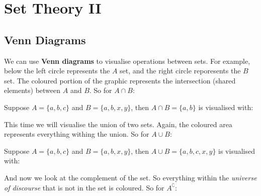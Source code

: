 \chapter{Set Theory II}

\section{Venn Diagrams}

We can use {\bf Venn diagrams} to visualise operations between sets. For example, below the left circle represents the $A$ set, and the right circle reporesents the $B$ set. The coloured portion of the graphic represents the intersection (shared elements) between $A$ and $B$. So for $A \cap B$:

\begin{venndiagram2sets}[shade=skyblue,showframe=false]
	\fillACapB
\end{venndiagram2sets}

\myexample
{
	Suppose $A=\{a,b,c\}$ and $B=\{a,b,x,y\}$, then $A \cap B=\{a,b\}$ is visualised with:\\
	\begin{venndiagram2sets}[shade=skyblue,showframe=false,labelOnlyA={c},labelOnlyB={x,y},labelAB={a,b}]
		\fillACapB
	\end{venndiagram2sets}
}

This time we will visualise the union of two sets. Again, the coloured area represents everything withing the union. So for $A \cup B$:

\begin{venndiagram2sets}[shade=skyblue,showframe=false]
	\fillA \fillB
\end{venndiagram2sets}

\myexample
{
	Suppose $A=\{a,b,c\}$ and $B=\{a,b,x,y\}$, then $A \cup B=\{a,b,c,x,y\}$  is visualised with:\\
	\begin{venndiagram2sets}[shade=skyblue,showframe=false,labelOnlyA={c},labelOnlyB={x,y},labelAB={a,b}]
		\fillA \fillB
	\end{venndiagram2sets}
}

And now we look at the complement of the set. So everything within the \emph{universe of discourse} that is not in the set is coloured. So for $A^\complement$:

\begin{venndiagram2sets}[shade=skyblue,overlap=2.4cm,hgap=2.2cm,vgap=0.5cm,labelNotAB={\;\quad\qquad $\mathcal{U}$},labelB={}]
	\fillNotA
\end{venndiagram2sets}

